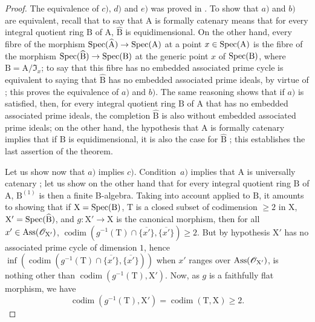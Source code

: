 \begin{proof}
The equivalence of $c)$, $d)$ and $e)$ was proved in .
To show that $a)$ and $b)$ are equivalent, recall  that to say that $\mathrm{A}$ is formally catenary means that for every integral quotient ring $\mathrm{B}$ of $\mathrm{A}$, $\widehat{\mathrm{B}}$ is equidimensional.
On the other hand, every fibre of the morphism $\operatorname{Spec}(\widehat{\mathrm{A}})\to\operatorname{Spec}(\mathrm{A})$ at a point $x\in\operatorname{Spec}(\mathrm{A})$ is the fibre of the morphism $\operatorname{Spec}(\widehat{\mathrm{B}})\to\operatorname{Spec}(\mathrm{B})$ at the generic point $x$ of $\operatorname{Spec}(\mathrm{B})$, where $\mathrm{B}=\mathrm{A}/\mathfrak{I}_x$; to say that this fibre has no embedded associated prime cycle is equivalent to saying that $\widehat{\mathrm{B}}$ has no embedded associated prime ideals, by virtue of ; this proves the equivalence of $a)$ and $b)$.
The same reasoning shows that if $a)$ is satisfied, then, for every integral quotient ring $\mathrm{B}$ of $\mathrm{A}$ that has no embedded associated prime ideals, the completion $\widehat{\mathrm{B}}$ is also without embedded associated prime ideals; on the other hand, the hypothesis that $\mathrm{A}$ is formally catenary implies that if $\mathrm{B}$ is equidimensional, it is also the case for $\widehat{\mathrm{B}}$ ; this establishes the last assertion of the theorem.

Let us show now that $a)$ implies $c)$.
Condition~$a)$ implies that $\mathrm{A}$ is universally catenary ; let us show on the other hand that for every integral quotient ring $\mathrm{B}$ of $\mathrm{A}$, $\mathrm{B}^{(1)}$ is then a finite B-algebra.
Taking into account  applied to $\mathrm{B}$, it amounts to showing that if $\mathrm{X}=\operatorname{Spec}(\mathrm{B})$, $\mathrm{T}$ is a closed subset of codimension $\geqslant 2$ in $\mathrm{X}$, $\mathrm{X}'=\operatorname{Spec}(\widehat{\mathrm{B}})$, and $g:\mathrm{X}'\to\mathrm{X}$ is the canonical morphism, then for all $x'\in\operatorname{Ass}(\mathscr{O}_{\mathrm{X}'})$, $\operatorname{codim}(g^{-1}(\mathrm{T})\cap\overline{\{x'\}},\overline{\{x'\}})\geqslant 2$.
But by hypothesis $\mathrm{X}'$ has no associated prime cycle of dimension $1$, hence $\inf(\operatorname{codim}(g^{-1}(\mathrm{T})\cap\overline{\{x'\}},\overline{\{x'\}}))$ when $x'$ ranges over $\operatorname{Ass}(\mathscr{O}_{\mathrm{X}'})$, is nothing other than $\operatorname{codim}(g^{-1}(\mathrm{T}),\mathrm{X}')$.
Now, as $g$ is a faithfully flat morphism, we have 
\[
  \operatorname{codim}(g^{-1}(\mathrm{T}),\mathrm{X}')=\operatorname{codim}(\mathrm{T},\mathrm{X})\geqslant 2.
\]


\end{proof}
